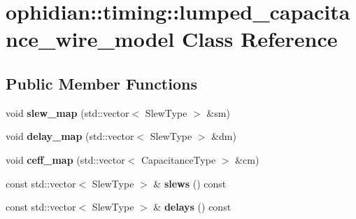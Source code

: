 \hypertarget{classophidian_1_1timing_1_1lumped__capacitance__wire__model}{\section{ophidian\-:\-:timing\-:\-:lumped\-\_\-capacitance\-\_\-wire\-\_\-model Class Reference}
\label{classophidian_1_1timing_1_1lumped__capacitance__wire__model}
}
\subsection*{Public Member Functions}
\begin{DoxyCompactItemize}
\item 
\hypertarget{classophidian_1_1timing_1_1lumped__capacitance__wire__model_ae9436a26168bf35565243abd64ed9a1c}{void {\bfseries slew\-\_\-map} (std\-::vector$<$ Slew\-Type $>$ \&sm)}\label{classophidian_1_1timing_1_1lumped__capacitance__wire__model_ae9436a26168bf35565243abd64ed9a1c}

\item 
\hypertarget{classophidian_1_1timing_1_1lumped__capacitance__wire__model_acd1346d813cf5bc5970c00296830bf47}{void {\bfseries delay\-\_\-map} (std\-::vector$<$ Slew\-Type $>$ \&dm)}\label{classophidian_1_1timing_1_1lumped__capacitance__wire__model_acd1346d813cf5bc5970c00296830bf47}

\item 
\hypertarget{classophidian_1_1timing_1_1lumped__capacitance__wire__model_a78ceb9c599ef7ff3cb6756968562b1ab}{void {\bfseries ceff\-\_\-map} (std\-::vector$<$ Capacitance\-Type $>$ \&cm)}\label{classophidian_1_1timing_1_1lumped__capacitance__wire__model_a78ceb9c599ef7ff3cb6756968562b1ab}

\item 
\hypertarget{classophidian_1_1timing_1_1lumped__capacitance__wire__model_a6c342bd4d4ea8ad5e426351e382c0e71}{const std\-::vector$<$ Slew\-Type $>$ \& {\bfseries slews} () const }\label{classophidian_1_1timing_1_1lumped__capacitance__wire__model_a6c342bd4d4ea8ad5e426351e382c0e71}

\item 
\hypertarget{classophidian_1_1timing_1_1lumped__capacitance__wire__model_ad728d14858b00af784fffed101134185}{const std\-::vector$<$ Slew\-Type $>$ \& {\bfseries delays} () const }\label{classophidian_1_1timing_1_1lumped__capacitance__wire__model_ad728d14858b00af784fffed101134185}


\end{DoxyCompactItemize}
